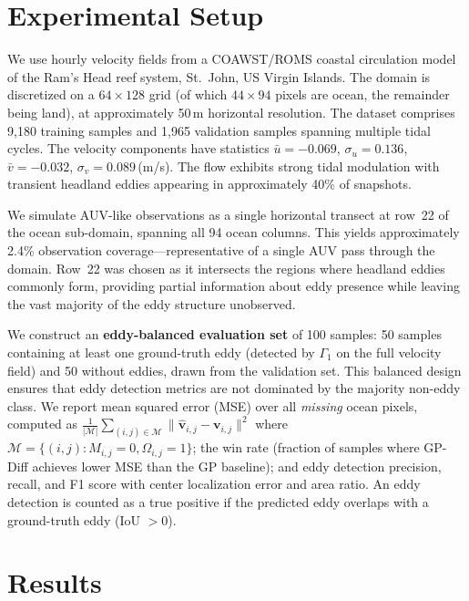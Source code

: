 \documentclass{article}
\begin{document}
\section{Experimental Setup}
\label{sec:experiments}

We use hourly velocity fields from a COAWST/ROMS coastal circulation model of the Ram's Head reef system, St.\ John, US Virgin Islands. The domain is discretized on a $64 \times 128$ grid (of which $44 \times 94$ pixels are ocean, the remainder being land), at approximately 50\,m horizontal resolution. The dataset comprises 9{,}180 training samples and 1{,}965 validation samples spanning multiple tidal cycles. The velocity components have statistics $\bar{u} = -0.069$, $\sigma_u = 0.136$, $\bar{v} = -0.032$, $\sigma_v = 0.089$\,(m/s). The flow exhibits strong tidal modulation with transient headland eddies appearing in approximately 40\% of snapshots.

We simulate AUV-like observations as a single horizontal transect at row~22 of the ocean sub-domain, spanning all 94 ocean columns. This yields approximately 2.4\% observation coverage---representative of a single AUV pass through the domain. Row~22 was chosen as it intersects the regions where headland eddies commonly form, providing partial information about eddy presence while leaving the vast majority of the eddy structure unobserved.

We construct an \textbf{eddy-balanced evaluation set} of 100 samples: 50 samples containing at least one ground-truth eddy (detected by $\Gamma_1$ on the full velocity field) and 50 without eddies, drawn from the validation set. This balanced design ensures that eddy detection metrics are not dominated by the majority non-eddy class. We report mean squared error (MSE) over all \emph{missing} ocean pixels, computed as $\frac{1}{|\mathcal{M}|}\sum_{(i,j) \in \mathcal{M}} \|\hat{\mathbf{v}}_{i,j} - \mathbf{v}_{i,j}\|^2$ where $\mathcal{M} = \{(i,j) : M_{i,j} = 0, \Omega_{i,j} = 1\}$; the win rate (fraction of samples where GP-Diff achieves lower MSE than the GP baseline); and eddy detection precision, recall, and F1 score with center localization error and area ratio. An eddy detection is counted as a true positive if the predicted eddy overlaps with a ground-truth eddy (IoU $> 0$).

\section{Results}
\label{sec:results}
\end{document}

